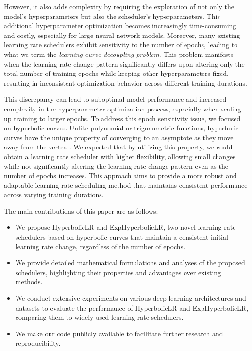 \documentclass{article}
\theoremstyle{plain}
\theoremstyle{definition}
\theoremstyle{remark}
\begin{document}
However, it also adds complexity by requiring the exploration of not only the model's hyperparameters but also the scheduler's hyperparameters.
This additional hyperparameter optimization becomes increasingly time-consuming and costly, especially for large neural network models.
Moreover, many existing learning rate schedulers exhibit sensitivity to the number of epochs, leading to what we term the \textit{learning curve decoupling problem}.
This problem manifests when the learning rate change pattern significantly differs upon altering only the total number of training epochs while keeping other hyperparameters fixed, resulting in inconsistent optimization behavior across different training durations.

This discrepancy can lead to suboptimal model performance and increased complexity in the hyperparameter optimization process, especially when scaling up training to larger epochs.
To address this epoch sensitivity issue, we focused on hyperbolic curves.
Unlike polynomial or trigonometric functions, hyperbolic curves have the unique property of converging to an asymptote as they move away from the vertex \cite{protter1970college}.
We expected that by utilizing this property, we could obtain a learning rate scheduler with higher flexibility, allowing small changes while not significantly altering the learning rate change pattern even as the number of epochs increases.
This approach aims to provide a more robust and adaptable learning rate scheduling method that maintains consistent performance across varying training durations.

The main contributions of this paper are as follows:
\begin{itemize}
   \item We propose HyperbolicLR and ExpHyperbolicLR, two novel learning rate schedulers based on hyperbolic curves that maintain a consistent initial learning rate change, regardless of the number of epochs.
   \item We provide detailed mathematical formulations and analyses of the proposed schedulers, highlighting their properties and advantages over existing methods.
   \item We conduct extensive experiments on various deep learning architectures and datasets to evaluate the performance of HyperbolicLR and ExpHyperbolicLR, comparing them to widely used learning rate schedulers.
   \item We make our code publicly available to facilitate further research and reproducibility.
\end{itemize}
\end{document}
